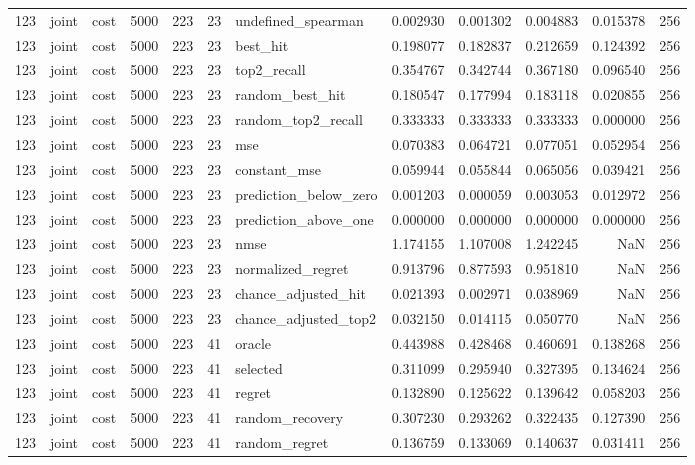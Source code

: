 \begin{tabular}{rllrrrlrrrrr}
123 & joint & cost & 5000 & 223 & 23 & undefined_spearman & 0.002930 & 0.001302 & 0.004883 & 0.015378 & 256 \\
123 & joint & cost & 5000 & 223 & 23 & best_hit & 0.198077 & 0.182837 & 0.212659 & 0.124392 & 256 \\
123 & joint & cost & 5000 & 223 & 23 & top2_recall & 0.354767 & 0.342744 & 0.367180 & 0.096540 & 256 \\
123 & joint & cost & 5000 & 223 & 23 & random_best_hit & 0.180547 & 0.177994 & 0.183118 & 0.020855 & 256 \\
123 & joint & cost & 5000 & 223 & 23 & random_top2_recall & 0.333333 & 0.333333 & 0.333333 & 0.000000 & 256 \\
123 & joint & cost & 5000 & 223 & 23 & mse & 0.070383 & 0.064721 & 0.077051 & 0.052954 & 256 \\
123 & joint & cost & 5000 & 223 & 23 & constant_mse & 0.059944 & 0.055844 & 0.065056 & 0.039421 & 256 \\
123 & joint & cost & 5000 & 223 & 23 & prediction_below_zero & 0.001203 & 0.000059 & 0.003053 & 0.012972 & 256 \\
123 & joint & cost & 5000 & 223 & 23 & prediction_above_one & 0.000000 & 0.000000 & 0.000000 & 0.000000 & 256 \\
123 & joint & cost & 5000 & 223 & 23 & nmse & 1.174155 & 1.107008 & 1.242245 & NaN & 256 \\
123 & joint & cost & 5000 & 223 & 23 & normalized_regret & 0.913796 & 0.877593 & 0.951810 & NaN & 256 \\
123 & joint & cost & 5000 & 223 & 23 & chance_adjusted_hit & 0.021393 & 0.002971 & 0.038969 & NaN & 256 \\
123 & joint & cost & 5000 & 223 & 23 & chance_adjusted_top2 & 0.032150 & 0.014115 & 0.050770 & NaN & 256 \\
123 & joint & cost & 5000 & 223 & 41 & oracle & 0.443988 & 0.428468 & 0.460691 & 0.138268 & 256 \\
123 & joint & cost & 5000 & 223 & 41 & selected & 0.311099 & 0.295940 & 0.327395 & 0.134624 & 256 \\
123 & joint & cost & 5000 & 223 & 41 & regret & 0.132890 & 0.125622 & 0.139642 & 0.058203 & 256 \\
123 & joint & cost & 5000 & 223 & 41 & random_recovery & 0.307230 & 0.293262 & 0.322435 & 0.127390 & 256 \\
123 & joint & cost & 5000 & 223 & 41 & random_regret & 0.136759 & 0.133069 & 0.140637 & 0.031411 & 256 \\

\end{tabular}
